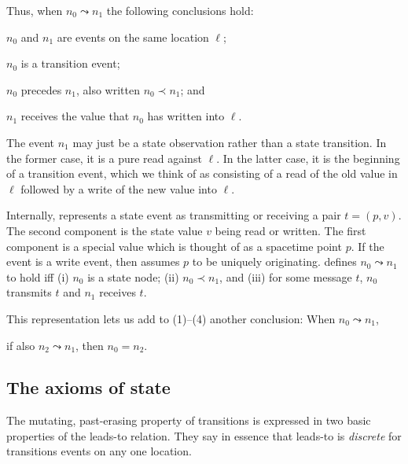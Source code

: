 Thus, when $n_0\leadsto n_1$ the following conclusions hold:
\begin{renumerate}
  \item $n_0$ and $n_1$ are events on the same location $\ell$;
  \item  $n_0$ is a transition event;
  \item $n_0$ precedes $n_1$, also written $n_0\prec n_1$; and
  \item $n_1$ receives the value that $n_0$ has written into $\ell$.
\end{renumerate}
%
The event $n_1$ may just be a state observation rather than a state
transition.  In the former case, it is a pure read against $\ell$.  In
the latter case, it is the beginning of a transition event, which we
think of as consisting of a read of the old value in $\ell$ followed
by a write of the new value into $\ell$.

Internally, {\cpsa} represents a state event as transmitting or
receiving a pair $t=(p,v)$.  The second component is the state value
$v$ being read or written.  The first component is a special value
which is thought of as a spacetime point $p$.  If the event is a write
event, then {\cpsa} assumes $p$ to be uniquely originating.  {\cpsa}
defines $n_0\leadsto n_1$ to hold iff (i) $n_0$ is a state node; (ii)
$n_0\prec n_1$, and (iii) for some message $t$, $n_0$ transmits $t$
and $n_1$ receives $t$.

This {\cpsa} representation lets us add to (1)--(4) another
conclusion:  When $n_0\leadsto n_1$,
%
\begin{renumerate}
  \item if also $n_2\leadsto n_1$, then $n_0=n_2$.
\end{renumerate}

\subsection{The axioms of state}
\label{sec:channels:state:axioms}

The mutating, past-erasing property of transitions is expressed in two
basic properties of the leads-to relation.  They say in essence that
leads-to is \emph{discrete} for transitions events on any one
location.

